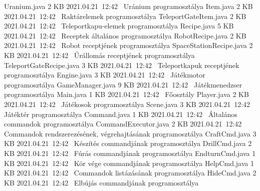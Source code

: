\documentclass[../../projlab]{subfiles}
\begin{document}
\begin{fajllista}
	\fajl
    {Uranium.java} %
    {2 KB} %
    {2021.04.21~12:42~} %
    {Uránium programosztálya} %
	\fajl
    {Item.java} %
    {2 KB} %
    {2021.04.21~12:42~} %
    {Raktárelemek programosztálya} %
	\fajl
    {TeleportGateItem.java} %
    {2 KB} %
    {2021.04.21~12:42~} %
    {Teleportkapu-elemek programosztálya} %
	\fajl
    {Recipe.java} %
    {5 KB} %
    {2021.04.21~12:42~} %
    {Receptek általános programosztálya} %
	\fajl
    {RobotRecipe.java} %
    {2 KB} %
    {2021.04.21~12:42~} %
    {Robot receptjének programosztálya} %
	\fajl
    {SpaceStationRecipe.java} %
    {2 KB} %
    {2021.04.21~12:42~} %
    {Űrállomás receptjének programosztálya} %
	\fajl
    {TeleportGateRecipe.java} %
    {3 KB} %
    {2021.04.21~12:42~} %
    {Teleportkapuk receptjének programosztálya} %
	\fajl
    {Engine.java} %
    {3 KB} %
    {2021.04.21~12:42~} %
    {Játékmotor programosztálya} %
	\fajl
    {GameManager.java} %
    {9 KB} %
    {2021.04.21~12:42~} %
    {Játékmenedzser programosztálya} %
	\fajl
    {Main.java} %
    {1 KB} %
    {2021.04.21~12:42~} %
    {Főosztály} %
	\fajl
    {Player.java} %
    {2 KB} %
    {2021.04.21~12:42~} %
    {Játékosok programosztálya} %
	\fajl
    {Scene.java} %
    {3 KB} %
    {2021.04.21~12:42~} %
    {Játéktér programosztálya} %
	\fajl
    {Command.java} %
    {1 KB} %
    {2021.04.21~12:42~} %
    {Általános commandok programosztálya} %
	\fajl
    {CommandExecutor.java} %
    {2 KB} %
    {2021.04.21~12:42~} %
    {Commandok rendszerezésének, végrehajtásának programosztálya} %
	\fajl
    {CraftCmd.java} %
    {3 KB} %
    {2021.04.21~12:42~} %
    {Készítés commandjának programosztálya} %
	\fajl
    {DrillCmd.java} %
    {2 KB} %
    {2021.04.21~12:42~} %
    {Fúrás commandjának programosztálya} %
	\fajl
    {EndturnCmd.java} %
    {1 KB} %
    {2021.04.21~12:42~} %
    {Kör vége commandjának programosztálya} %
	\fajl
    {HelpCmd.java} %
    {1 KB} %
    {2021.04.21~12:42~} %
    {Commandok listázásának programosztálya} %
	\fajl
    {HideCmd.java} %
    {2 KB} %
    {2021.04.21~12:42~} %
    {Elbújás commandjának programosztálya} %

\end{fajllista}
\end{document}
